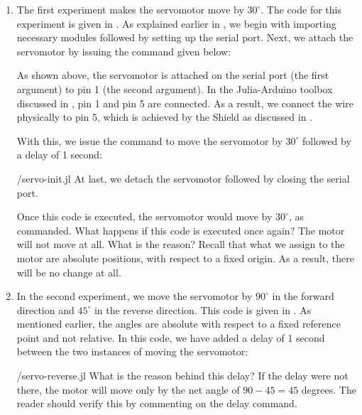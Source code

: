 \begin{enumerate}
  \item The first experiment makes the servomotor move by $30^\circ$. The code for this experiment is
        given in . As explained earlier in , 
        we begin with importing necessary modules followed by setting up the serial port.
        Next, we attach the servomotor by issuing the command given below:
        
        As shown above, the servomotor is attached on the serial port (the first argument)
        to pin 1 (the second argument).  In the Julia-Arduino toolbox discussed 
        in , pin 1 and pin 5 are connected. As a result, we connect the wire physically to
        pin 5, which is achieved by the Shield as discussed in .
        
        With this, we issue the command to move the servomotor by $30^\circ$ followed by a delay of 
        1 second:
        
        {\LocSERjuliacode/servo-init.jl}
        At last, we  detach the servomotor followed by closing the serial port. 
        
        Once this code is executed, the servomotor would move by
        $30^\circ$, as commanded.  What happens if this code is executed
        once again?  The motor will not move at all.  What is the reason?
        Recall that what we assign to the motor are absolute positions, with
        respect to a fixed origin.  As a result, there will be no change at
        all. 
        
  \item In the second experiment, we move the servomotor by $90^\circ$ in the
        forward direction and $45^\circ$ in the reverse direction.  This
        code is given in .  As mentioned
        earlier, the angles are absolute with respect to a fixed reference
        point and not relative.   In this code, 
        we have added a delay of 1 second between the two instances of 
        moving the servomotor: 
        
        {\LocSERjuliacode/servo-reverse.jl}
        What is the reason behind this delay?  If the delay were not
        there, the motor will move only by the net angle of $90-45 = 45$
        degrees.  The reader should verify this by commenting on the delay
        command. 
        

\end{enumerate}
